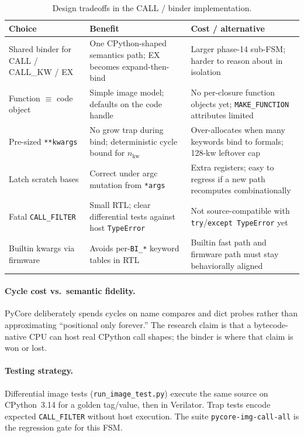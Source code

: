 \documentclass[11pt,a4paper]{article}
\begin{document}
\begin{table}[ht]
\centering
\begin{tabular}{@{}p{}p{}p{}@{}}
\toprule
Choice & Benefit & Cost / alternative \\
\midrule
Shared binder for CALL / CALL\_KW / EX
  & One CPython-shaped semantics path; EX becomes expand-then-bind
  & Larger phase-14 sub-FSM; harder to reason about in isolation \\
\addlinespace
Function $\equiv$ code object
  & Simple image model; defaults on the code handle
  & No per-closure function objects yet; \texttt{MAKE\_FUNCTION} attributes
    limited \\
\addlinespace
Pre-sized \texttt{**kwargs}
  & No grow trap during bind; deterministic cycle bound for $n_{\mathrm{kw}}$
  & Over-allocates when many keywords bind to formals; 128-kw leftover cap \\
\addlinespace
Latch scratch bases
  & Correct under argc mutation from \texttt{*args}
  & Extra registers; easy to regress if a new path recomputes combinationally \\
\addlinespace
Fatal \texttt{CALL\_FILTER}
  & Small RTL; clear differential tests against host \texttt{TypeError}
  & Not source-compatible with \texttt{try}/\texttt{except TypeError} yet \\
\addlinespace
Builtin kwargs via firmware
  & Avoids per-\texttt{BI\_*} keyword tables in RTL
  & Builtin fast path and firmware path must stay behaviorally aligned \\
\bottomrule
\end{tabular}
\caption{Design tradeoffs in the CALL / binder implementation.}
\label{tab:tradeoffs}
\end{table}

\paragraph{Cycle cost vs.\ semantic fidelity.}
PyCore deliberately spends cycles on name compares and dict probes rather than
approximating ``positional only forever.''
The research claim is that a bytecode-native CPU can host real CPython call
shapes; the binder is where that claim is won or lost.

\paragraph{Testing strategy.}
Differential image tests (\texttt{run\_image\_test.py}) execute the same source
on CPython~3.14 for a golden tag/value, then in Verilator.
Trap tests encode expected \texttt{CALL\_FILTER} without host execution.
The suite \texttt{pycore-img-call-all} is the regression gate for this FSM.
\end{document}

